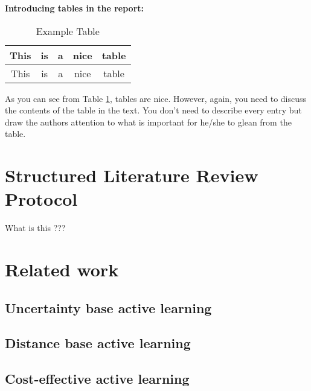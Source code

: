 


\noindent
{\bf Introducing tables in the report: }\\

\begin{table}[htbp]
\begin{center}
\begin{tabular}{|c|c|c|c|c|}\hline\hline
This & is & a & nice & table\\\hline
This & is & a & nice & table\\\hline\hline
\end{tabular}
\caption{Example Table}
\end{center}
\label{tab:ExampleTable}
\end{table}%

As you can see from Table \ref{tab:ExampleTable}, tables are nice. However, again, you need to discuss the contents of the table in the text. You don't need to describe every entry but draw the authors attention to what is important for he/she to glean from the table. 

\section{Structured Literature Review Protocol}

What is this ???

\section{Related work}
\label{sec:no2}

\subsection{Uncertainty base active learning}
\subsection{Distance base active learning}
\subsection{Cost-effective active learning}
